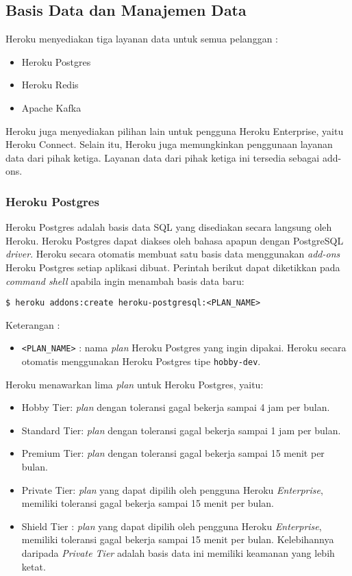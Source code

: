 \subsection{Basis Data dan Manajemen Data}
Heroku menyediakan tiga layanan data untuk semua pelanggan :
\begin{itemize}
\item Heroku Postgres
\item Heroku Redis
\item Apache Kafka
\end{itemize}
Heroku juga menyediakan pilihan lain untuk pengguna Heroku Enterprise, yaitu Heroku Connect. Selain itu, Heroku juga memungkinkan penggunaan layanan data dari pihak ketiga. Layanan data dari pihak ketiga ini tersedia sebagai add-ons.

\subsubsection{Heroku Postgres}
Heroku Postgres adalah basis data SQL yang disediakan secara langsung oleh Heroku. Heroku Postgres dapat diakses oleh bahasa apapun dengan PostgreSQL \textit{driver}. Heroku secara otomatis membuat satu basis data menggunakan \textit{add-ons} Heroku Postgres setiap aplikasi dibuat. Perintah berikut dapat diketikkan pada \textit{command shell} apabila ingin menambah basis data baru:
\begin{lstlisting}
$ heroku addons:create heroku-postgresql:<PLAN_NAME>
\end{lstlisting}
Keterangan :
\begin{itemize}
\item \texttt{<PLAN\_NAME>} : nama \textit{plan} Heroku Postgres yang ingin dipakai. Heroku secara otomatis menggunakan Heroku Postgres tipe \texttt{hobby-dev}.
\end{itemize}

Heroku menawarkan lima \textit{plan} untuk Heroku Postgres, yaitu:
\begin{itemize}
\item Hobby Tier: \textit{plan} dengan toleransi gagal bekerja sampai 4 jam per bulan.
\item Standard Tier: \textit{plan} dengan toleransi gagal bekerja sampai 1 jam per bulan.
\item Premium Tier: \textit{plan} dengan toleransi gagal bekerja sampai 15 menit per bulan.
\item Private Tier: \textit{plan} yang dapat dipilih oleh pengguna Heroku \textit{Enterprise}, memiliki toleransi gagal bekerja sampai 15 menit per bulan.
\item Shield Tier : \textit{plan} yang dapat dipilih oleh pengguna Heroku \textit{Enterprise}, memiliki toleransi gagal bekerja sampai 15 menit per bulan. Kelebihannya daripada \textit{Private Tier} adalah basis data ini memiliki keamanan yang lebih ketat.
\end{itemize}

